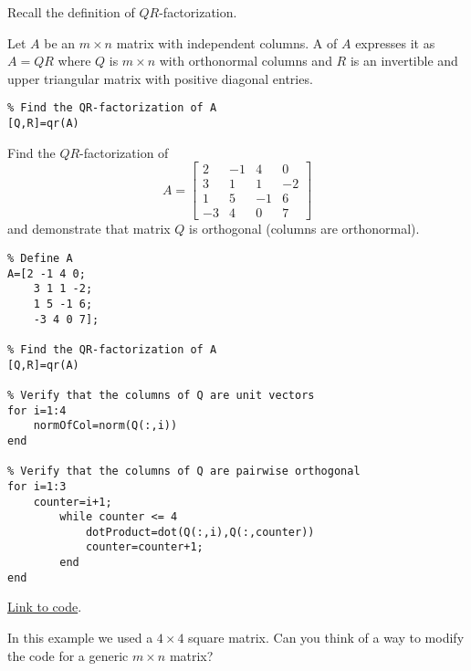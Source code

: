 \documentclass{ximera}
\begin{document}
Recall the definition of $QR$-factorization.
\begin{definition}[\ref{def:QR-factorization}]
Let $A$ be an $m \times n$ matrix with independent columns. A  of $A$ expresses it as $A = QR$ where $Q$ is $m \times n$ with orthonormal columns and $R$ is an invertible and upper triangular matrix with positive diagonal entries.
\end{definition}

\begin{template}\label{temp:qr}

\begin{verbatim}
% Find the QR-factorization of A
[Q,R]=qr(A)
\end{verbatim}
\end{template}

\begin{example}\label{ex:qrOrthonormalQ}
Find the $QR$-factorization of 
$$A=\begin{bmatrix}2 & -1 & 4 & 0\\
    3 & 1 & 1 & -2\\
    1 & 5 & -1 & 6\\
    -3 & 4 & 0 & 7\end{bmatrix}$$
and demonstrate that matrix $Q$ is orthogonal (columns are orthonormal).     
\begin{explanation}
    \begin{verbatim}
% Define A
A=[2 -1 4 0;
    3 1 1 -2;
    1 5 -1 6;
    -3 4 0 7];

% Find the QR-factorization of A
[Q,R]=qr(A)

% Verify that the columns of Q are unit vectors
for i=1:4
    normOfCol=norm(Q(:,i))
end    

% Verify that the columns of Q are pairwise orthogonal
for i=1:3
    counter=i+1;
        while counter <= 4
            dotProduct=dot(Q(:,i),Q(:,counter))
            counter=counter+1;
        end
end
    \end{verbatim}
  
\href{https://sagecell.sagemath.org/?z=eJyNT8FOwzAMvVfqP_gyqROtRNYC0iCHCsQVugOXaYeodailLoY0ZYKvJ1kzDW57PtiW_d6zF_CEmgxCnSa13K6gEFDB9X2agEcJwkexiq2AmzC_jW1RhlW42_k-TRbwTKYD1yM0m0Kr1rGlH-WIDbAO-tsm3-zkp83q5Ux4Q0v621OUO_JaHqa9GcN6A8oiTIYcfGGQGtNEswWSYl3N9obt_kU_8iBDlTXZOqelV0Z_hceFFh-K7IFGBLau53c2ajg7lbNTy5NxaCVdifh6wKGnAU8zeJBQnWcBHbtXy93UOunLeF8eUuSEY_8STjYx_zPzTx0_-wUZ_XQT&lang=octave&interacts=eJyLjgUAARUAuQ==}{Link to code}.
\end{explanation}  
In this example we used a $4\times 4$ square matrix.  Can you think of a way to modify the code for a generic $m\times n$ matrix?
\end{example}
\end{document}
